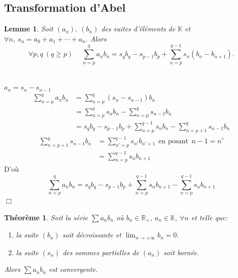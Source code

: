 \documentclass[11pt, a4paper]{book}
\newtheorem{teo}{Th\'eor\`eme}[section]
\newtheorem{lem}{Lemme}[section]
\newenvironment{pr}{\noindent {\bf Preuve} \noindent} {\hfill $\Box$\vskip 5mm}
\begin{document}
\subsection{ Transformation d'Abel }
\begin{lem} Soit $(a_n), ~(b_n)$ des suites d'\'el\'ements de $ \mathbb{K}$ et $\forall n,~ s_n=a_0+a_1+\cdots+a_n.$
 Alors $$\forall p,q~(q\geq p)\quad~{\displaystyle  \sum_{n=p}^q a_n b_n =s_q b_q-s_{p-1}b_p+\sum_{n=p}^{q-1} s_n(b_n-b_{n+1})}.$$ \end{lem} 
\begin{pr}\\ $a_n=s_n -s_{n-1}$ \begin{align*} \sum_{n=p}^q a_n b_n &=\sum_{n=p}^q(s_n-s_{n-1})b_n\\ &=\sum_{n=p}^q s_n b_n -\sum_{n=p}^q s_{n-1}b_n\\ &= s_q b_q-s_{p-1}b_p+\sum_{n=p}^{q-1}s_n b_n- \sum_{n=p+1}^q
 s_{n-1}b_n \end{align*} \begin{align*} \sum_{n=p+1}^q s_{n-1}b_n &=\sum_{n'=p}^{q-1}s_{n'}b_{n'+1} ~~\text{en posant}~~n-1=n'\\ &=\sum_{n=p}^{q-1}s_n b_{n+1} \end{align*} D'o\`u $$ \sum_{n=p}^q a_n b_n = s_q b_q -s_{p-1}b_p +\sum_{n=p}^{q-1} s_n b_{n+1} -\sum_{n=p}^{q-1} s_n b_{n+1} $$ 
 \end{pr}
 \begin{teo} \label{teo2.4.4.1} Soit la s\'erie $\sum a_n b_n $ o\`u $b_n \in \mathbb{R}_{+},~a_n \in \mathbb{K},~\forall n$ et telle que: \begin{enumerate}
 \item[i-] la suite $(b_n)$ soit d\'ecroissante et ${\displaystyle \lim_{n\rightarrow+\infty}b_n=0.}$ 
 \item[ii-] la suite $(s_n)$ des sommes partielles de $(a_n)$ soit born\'ee.
 \end{enumerate}
 Alors $\sum a_n b_n$ est convergente. \end{teo}
\end{document}
